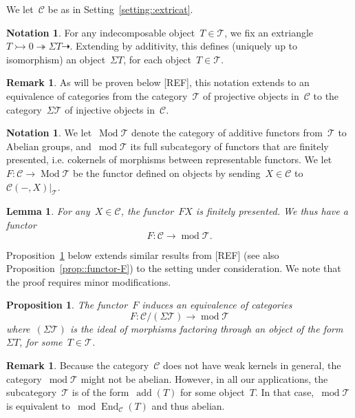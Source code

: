 \documentclass{amsart}
\newtheorem{proposition}[theorem]{Proposition}
\newtheorem{lemma}[theorem]{Lemma}
\theoremstyle{definition}
\newtheorem{remark}[theorem]{Remark}
\newtheorem{notation}[theorem]{Notation}
\newcommand{\yann}[1]{\todo[color=red!30]{#1 --- Y.}}
\newcommand{\cat}{\mathcal{C}}
\newcommand{\susp}{\Sigma}
\newcommand{\add}{\operatorname{add}}
\newcommand{\MOD}{\operatorname{mod}}
\newcommand{\End}[1]{\operatorname{End}_{#1}}
\newcommand{\tc}{\mathcal{T}}
\newcommand{\infl}{\rightarrowtail}
\newcommand{\defl}{\twoheadrightarrow}
\newcommand{\Modt}{\operatorname{Mod}\tc}
\newcommand{\modt}{\MOD\tc}
\begin{document}
We let~$\cat$ be as in Setting~\ref{setting::extricat}.

\begin{notation}
For any indecomposable object~$T\in\tc$, we fix an extriangle~$T\infl 0 \defl \susp T \dashrightarrow$.
Extending by additivity, this defines (uniquely up to isomorphism) an object~$\susp T$, for each object~$T\in\tc$.
\end{notation}

\begin{remark}
 As will be proven below [REF], this notation extends to an equivalence of categories from the category~$\tc$ of projective objects in~$\cat$ to the category~$\susp\tc$ of injective objects in~$\cat$.
\end{remark}


\begin{notation}
We let~$\Modt$ denote the category of additive functors from~$\tc$ to Abelian groups, and~$\modt$ its full subcategory of functors that are finitely presented, i.e. cokernels of morphisms between representable functors.
We let~$F:\cat\to\Modt$ be the functor defined on objects by sending~$X\in\cat$ to~$\cat(-,X)|_\tc$.
\end{notation}

\begin{lemma}
For any~$X\in\cat$, the functor~$FX$ is finitely presented.
We thus have a functor
\[
F:\cat\to\modt.
\]
\end{lemma}

Proposition~\ref{prop::KRextricat} below extends similar results from [REF]\yann{ref: BMR, KR ,KZ, IY...} (see also Proposition~\ref{prop::functor-F}) to the setting under consideration. We note that the proof requires minor modifications.

\begin{proposition}\label{prop::KRextricat}
The functor~$F$ induces an equivalence of categories
\[
F: \cat/(\susp\tc) \to \modt
\]
where~$(\susp\tc)$ is the ideal of morphisms factoring through an object of the form~$\susp T$, for some~$T\in\tc$.
\end{proposition}

\begin{remark}
Because the category~$\cat$ does not have weak kernels in general, the category~$\modt$ might not be abelian.
However, in all our applications, the subcategory~$\tc$ is of the form~$\add(T)$ for some object~$T$.
In that case,~$\modt$ is equivalent to~$\MOD\End{\cat}(T)$ and thus abelian.
\end{remark}
\end{document}
